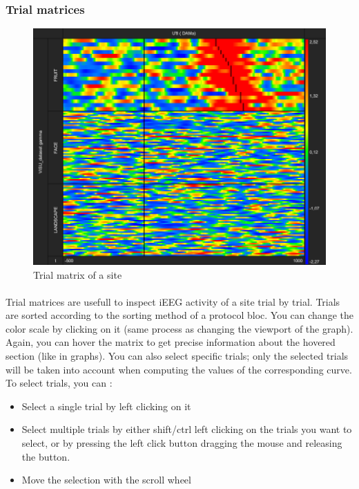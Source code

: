 \documentclass[a4paper]{article}
\begin{document}
\subsubsection{Trial matrices}
\begin{figure}[H]
\begin{center}
\includegraphics[scale=0.35]{TrialMatrix.png}
\end{center}
\caption{\label{trialMatrix}Trial matrix of a site}
\end{figure}
\paragraph{} Trial matrices are usefull to inspect iEEG activity of a site trial by trial. Trials are sorted according to the sorting method of a protocol bloc. You can change the color scale by clicking on it (same process as changing the viewport of the graph). Again, you can hover the matrix to get precise information about the hovered section (like in graphs). You can also select specific trials; only the selected trials will be taken into account when computing the values of the corresponding curve. To select trials, you can :
\begin{itemize}
\item Select a single trial by left clicking on it
\item Select multiple trials by either shift/ctrl left clicking on the trials you want to select, or by pressing the left click button dragging the mouse and releasing the button.
\item Move the selection with the scroll wheel
\end{itemize}
\end{document}
